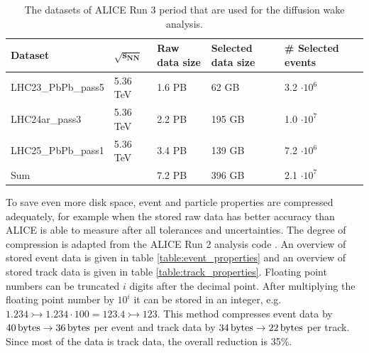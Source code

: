 \documentclass[
  a4paper,
  12pt,
  oneside,
  parskip=half,
  listof=totoc,
  bibliography=totoc,
  DIV=12,
  numbers=noenddot,
  BA.tex
  ]{subfiles}
\begin{document}
\begin{table}[H]
	\begin{footnotesize}
		\begin{center}
			\begin{tabular}{llllll}
				\hline
				\textbf{Dataset} & $\mathbf{\sqrt{s_{NN}}}$ & \textbf{Raw data size} & \textbf{Selected data size} & \# \textbf{Selected events} \\
				\hline
				LHC23\_PbPb\_pass5 & 5.36 TeV & 1.6 PB & 62 GB & 3.2 $\cdot 10^6$ \\
				
				LHC24ar\_pass3 & 5.36 TeV & 2.2 PB & 195 GB & 1.0 $\cdot 10^7$ \\
				
				LHC25\_PbPb\_pass1 & 5.36 TeV & 3.4 PB & 139 GB & 7.2 $\cdot 10^6$ \\
				\hline
				Sum &  &  7.2 PB & 396 GB & 2.1 $\cdot 10^7$ \\
				
			\end{tabular}
		\end{center}
	\end{footnotesize}
	\caption{The datasets of ALICE Run 3 period that are used for the diffusion wake analysis.}
	\label{table:RUN3_Data}
\end{table}

To save even more disk space, event and particle properties are compressed adequately, for example when the stored raw data has better accuracy than ALICE is able to measure after all tolerances and uncertainties. The degree of compression is adapted from the ALICE Run 2 analysis code \cite{nadine_alice_grunwald_studies_2022}. An overview of stored event data is given in table \ref{table:event_properties} and an overview of stored track data is given in table \ref{table:track_properties}. Floating point numbers can be truncated $i$ digits after the decimal point. After multiplying the floating point number by $10^i$ it can be stored in an integer, e.g. $1.234 \rightarrowtail 1.234 \cdot 100 = 123.4 \rightarrowtail 123$. This method compresses event data by $40\bunit{bytes} \rightarrow 36\bunit{bytes}$ per event and track data by $34\bunit{bytes} \rightarrow 22\bunit{bytes}$ per track. Since most of the data is track data, the overall reduction is 35\%.
\end{document}
